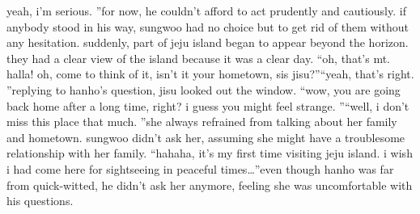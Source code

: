 yeah, i’m serious.
”for now, he couldn’t afford to act prudently and cautiously.
 if anybody stood in his way, sungwoo had no choice but to get rid of them without any hesitation.
suddenly, part of jeju island began to appear beyond the horizon.
 they had a clear view of the island because it was a clear day.
“oh, that’s mt.
 halla! oh, come to think of it, isn’t it your hometown, sis jisu?”“yeah, that’s right.
”replying to hanho’s question, jisu looked out the window.
“wow, you are going back home after a long time, right? i guess you might feel strange.
”“well, i don’t miss this place that much.
”she always refrained from talking about her family and hometown.
 sungwoo didn’t ask her, assuming she might have a troublesome relationship with her family.
“hahaha, it’s my first time visiting jeju island.
 i wish i had come here for sightseeing in peaceful times…”even though hanho was far from quick-witted, he didn’t ask her anymore, feeling she was uncomfortable with his questions.

